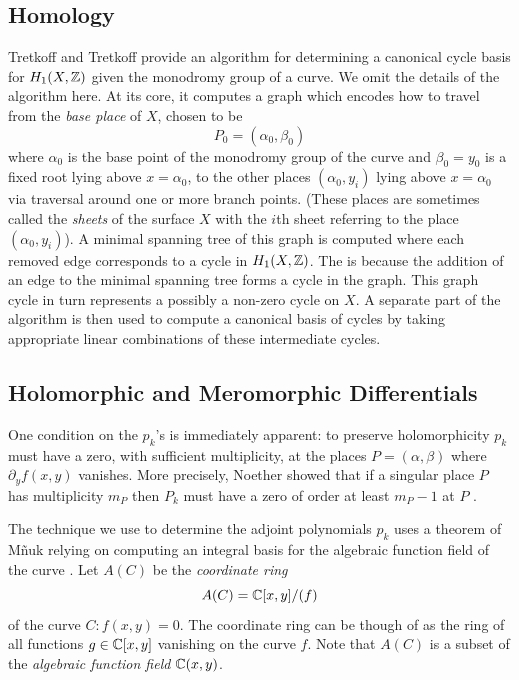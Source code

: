 \subsection{Homology}\label{subsec:abelfunctions-homology}


Tretkoff and Tretkoff \cite{TretkoffTretkoff84} provide an algorithm for
determining a canonical cycle basis for $H_1(X,\operatorname{\mathbb{Z}})$ given the monodromy group
of a curve. We omit the details of the algorithm here. At its core, it computes
a graph which encodes how to travel from the {\it base place} of $X$, chosen to
be
\[
  P_0 = (\alpha_0, \beta_0)
\]
where $\alpha_0$ is the base point of the monodromy group of the curve and
$\beta_0 = y_0$ is a fixed root lying above $x = \alpha_0$, to the other places
$(\alpha_0, y_i)$ lying above $x = \alpha_0$ via traversal around one or more
branch points. (These places are sometimes called the {\it sheets} of the
surface $X$ with the $i$th sheet referring to the place $(\alpha_0,y_i)$). A
minimal spanning tree of this graph is computed where each removed edge
corresponds to a cycle in $H_1(X,\operatorname{\mathbb{Z}})$. The is because the addition of an edge
to the minimal spanning tree forms a cycle in the graph. This graph cycle in
turn represents a possibly a non-zero cycle on $X$. A separate part of the
algorithm is then used to compute a canonical basis of cycles by taking
appropriate linear combinations of these intermediate cycles.


\subsection{Holomorphic and Meromorphic
  Differentials}\label{subsec:background-holomorphic-and-meromorphic-differentials}

One condition on the $p_k$'s is immediately apparent: to preserve holomorphicity
$p_k$ must have a zero, with sufficient multiplicity, at the places $P =
(\alpha,\beta)$ where $\partial_y f(x,y)$ vanishes. More precisely, Noether
showed that if a singular place $P$ has multiplicity $m_P$ then $P_k$ must have
a zero of order at least $m_P - 1$ at $P$ \cite{Noether83}.

The technique we use to determine the adjoint polynomials $p_k$ uses a theorem
of M\~{n}uk relying on computing an integral basis for the algebraic function
field of the curve \cite{Mnuk97}. Let $A(C)$ be the {\it coordinate ring}
\[
  A(C) = \operatorname{\mathbb{C}}[x,y] / (f)
\]
of the curve $C : f(x,y) = 0$. The coordinate ring can be though of as the ring
of all functions $g \in \operatorname{\mathbb{C}}[x,y]$ vanishing on the curve $f$. Note that $A(C)$
is a subset of the {\it algebraic function field} $\operatorname{\mathbb{C}}(x,y)$.

